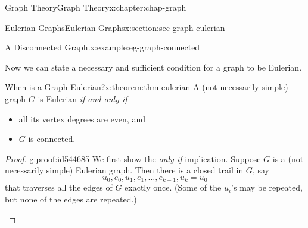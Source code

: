 \documentclass[oneside,10pt,]{book}
\numberwithin{equation}{section}
\begin{document}
\begin{chapterptx}{Graph Theory}{}{Graph Theory}{}{}{x:chapter:chap-graph}
\begin{sectionptx}{Eulerian Graphs}{}{Eulerian Graphs}{}{}{x:section:sec-graph-eulerian}
\begin{example}{A Disconnected Graph.}{x:example:eg-graph-connected}
\begin{sidebyside}{1}{0.415}{0.415}{0}
\begin{sbspanel}{0.17}
{
}%
\end{sbspanel}%
\end{sidebyside}%
\end{example}
Now we can state a necessary and sufficient condition for a graph to be Eulerian.%
\begin{theorem}{When is a Graph Eulerian?}{}{x:theorem:thm-eulerian}%
A (not necessarily simple) graph \(G\) is Eulerian \emph{if and only if}%
\begin{itemize}[label=\textbullet]
\item{}all its vertex degrees are even, and%
\item{}\(G\) is connected.%
\end{itemize}
%
\end{theorem}
\begin{proof}{}{g:proof:id544685}
We first show the \emph{only if} implication. Suppose \(G\) is a (not necessarily simple) Eulerian graph. Then there is a closed trail in \(G\), say%
\begin{equation*}
u_0, e_0, u_1, e_1, \ldots, e_{k-1}, u_k = u_0
\end{equation*}
that traverses all the edges of \(G\) exactly once. (Some of the \(u_i\)'s may be repeated, but none of the edges are repeated.)%
\begin{sidebyside}{1}{0.275}{0.275}{0}%
\begin{sbspanel}{0.45}%
\resizebox{\linewidth}{!}{%
			\begin{tikzpicture}[scale=0.7]

\end{tikzpicture}}
\end{sbspanel}
\end{sidebyside}
\end{proof}
\end{sectionptx}
\end{chapterptx}
\end{document}
